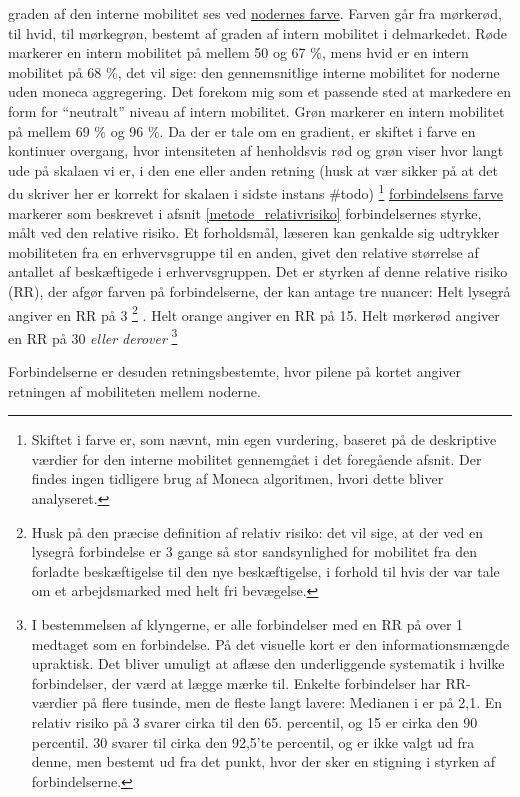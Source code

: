 graden af den interne mobilitet ses ved \underline{nodernes farve}. Farven går fra mørkerød, til hvid, til mørkegrøn, bestemt af graden af intern mobilitet i delmarkedet. Røde markerer en intern mobilitet på mellem 50 og 67 \%, mens hvid er en intern mobilitet på 68 \%, det vil sige: den gennemsnitlige interne mobilitet for noderne uden moneca aggregering. Det forekom mig som et passende sted at markedere en form for “neutralt” niveau af intern mobilitet. Grøn markerer en intern mobilitet på mellem 69 \% og 96 \%.  Da der er tale om en gradient, er skiftet i farve en kontinuer overgang, hvor intensiteten af henholdsvis rød og grøn viser hvor langt ude på skalaen vi er, i den ene eller anden retning (husk at vær sikker på at det du skriver her er korrekt for skalaen i sidste instans \#todo)%
%
\footnote{ Skiftet i farve er, som nævnt, min egen vurdering, baseret på de deskriptive værdier for den interne mobilitet gennemgået i det foregående afsnit. Der findes ingen tidligere brug af Moneca algoritmen, hvori dette bliver analyseret.}%
%
 \underline{forbindelsens farve} markerer som beskrevet i afsnit \ref{metode_relativrisiko} forbindelsernes styrke, målt ved den relative risiko. Et forholdsmål, læseren kan genkalde sig udtrykker mobiliteten fra en erhvervsgruppe til en anden, givet den relative størrelse af antallet af beskæftigede i erhvervsgruppen. Det er styrken af denne relative risiko (RR), der afgør farven på forbindelserne, der kan antage tre nuancer: Helt lysegrå angiver en RR på 3%
%
\footnote{Husk på den præcise definition af relativ risiko:  det vil sige, at der ved en lysegrå forbindelse er 3 gange så stor sandsynlighed for mobilitet fra den forladte beskæftigelse til den nye beskæftigelse, i forhold til hvis der var tale om et arbejdsmarked med helt fri bevægelse.}%
%
. Helt orange angiver en RR på 15. Helt mørkerød angiver en RR på 30 \emph{ eller derover}%
%
\footnote{ I bestemmelsen af klyngerne, er alle forbindelser med en RR på over 1 medtaget som en forbindelse. På det visuelle kort er den informationsmængde upraktisk. Det bliver umuligt at aflæse den underliggende systematik i hvilke forbindelser, der værd at lægge mærke til. Enkelte forbindelser har RR-værdier på flere tusinde, men de fleste langt lavere: Medianen i er på 2,1. En relativ risiko på 3 svarer cirka til den 65. percentil, og 15 er cirka den 90 percentil. 30 svarer til cirka den 92,5'te percentil, og er ikke valgt ud fra denne, men bestemt ud fra det punkt, hvor der sker en stigning i styrken af forbindelserne. }%
%

Forbindelserne er desuden retningsbestemte, hvor pilene på kortet angiver retningen af mobiliteten mellem noderne.

